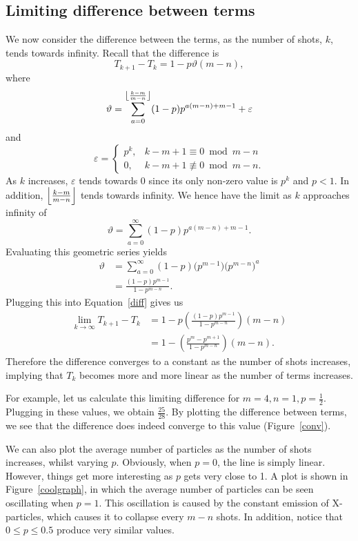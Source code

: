 \subsection{Limiting difference between terms}
We now consider the difference between the terms, as the number of shots, $k$, tends towards infinity. Recall that the difference is 
\begin{equation}\label{diff}
  T_{k+1} - T_{k} = 1 - p\vartheta(m-n),
  \end{equation}
  where \[
\vartheta = \sum_{a=0}^{\floor*{\frac{k-m}{m-n}}} (1-p)p^{a(m-n)+m-1} + \varepsilon
\] and \[
  \varepsilon = 
  \begin{cases}
    p^{k}, &k-m+1 \equiv 0 \bmod m-n \\
    0, &k-m+1 \not\equiv 0 \bmod m-n.
  \end{cases}
\] As $k$ increases, $\varepsilon$ tends towards 0 since its only non-zero value is $p^{k}$ and $p < 1$. In addition, $\floor*{\frac{k-m}{m-n}}$ tends towards infinity. We hence have the limit as $k$ approaches infinity of \[
  \vartheta = \sum_{a=0}^{\infty} (1-p)p^{a(m-n)+m-1}
.\] Evaluating this geometric series yields
\begin{align*}
  \vartheta &= \sum_{a=0}^{\infty} (1-p)\bigl(p^{m-1}\bigr)\bigl(p^{m-n}\bigr)^{a} \\
            &= \frac{(1-p)p^{m-1}}{1-p^{m-n}}.
\end{align*}
Plugging this into Equation~\ref{diff} gives us
\begin{align}
  \lim_{k \to \infty} T_{k+1} - T_{k} &= 1 - p\left( \frac{(1-p)p^{m-1}}{1-p^{m-n}} \right) (m-n) \nonumber \\
                                      &= 1 - \left( \frac{p^{m} - p^{m+1}}{1-p^{m-n}} \right) (m-n). \label{eq:4}
\end{align}
Therefore the difference converges to a constant as the number of shots increases, implying that $T_k$ becomes more and more linear as the number of terms increases.

For example, let us calculate this limiting difference for $m = 4, n = 1, p = \frac{1}{2}$. Plugging in these values, we obtain $\frac{25}{28}$. By plotting the difference between terms, we see that the difference does indeed converge to this value (Figure~\ref{conv}).

We can also plot the average number of particles as the number of shots increases, whilst varying $p$. Obviously, when $p = 0$, the line is simply linear. However, things get more interesting as $p$ gets very close to 1. A plot is shown in Figure~\ref{coolgraph}, in which the average number of particles can be seen oscillating when $p = 1$. This oscillation is caused by the constant emission of X-particles, which causes it to collapse every $m-n$ shots. In addition, notice that $0 \le p \le 0.5$ produce very similar values.
